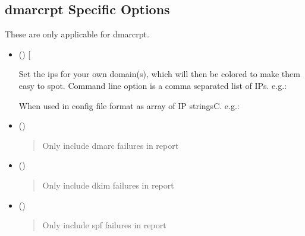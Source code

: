 \documentclass[letterpaper,10pt,english]{sphinxmanual}
\begin{document}
\subsection{dmarc\sphinxhyphen{}rpt Specific Options}
\label{\detokenize{README:dmarc-rpt-specific-options}}
\sphinxAtStartPar
These are only applicable for dmarc\sphinxhyphen{}rpt.
\begin{itemize}
\item {} 
\sphinxAtStartPar
()  {[}\sphinxstyleemphasis{dom\_ips = {[}ip, cidr, … {]}}{]}

\sphinxAtStartPar
Set the ips for your own domain(s), which will then be colored to make them easy to spot.
Command line option is a comma separated list of IPs.
e.g.:

\begin{sphinxVerbatim}[commandchars=\\\{\}]
 
\end{sphinxVerbatim}

\sphinxAtStartPar
When used in config file format as array of IP stringsC.
e.g.:

\begin{sphinxVerbatim}[commandchars=\\\{\}]
  \PYG{p}{[} \PYG{p}{]}
\end{sphinxVerbatim}

\item {} 
\sphinxAtStartPar
()
\begin{quote}

\sphinxAtStartPar
Only include dmarc failures in report
\end{quote}

\item {} 
\sphinxAtStartPar
()
\begin{quote}

\sphinxAtStartPar
Only include dkim failures in report
\end{quote}

\item {} 
\sphinxAtStartPar
()
\begin{quote}

\sphinxAtStartPar
Only include spf failures in report
\end{quote}

\end{itemize}
\end{document}
